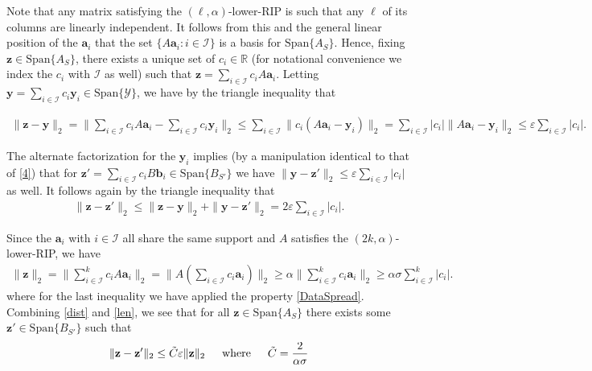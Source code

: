 \documentclass[journal,onecolumn]{IEEEtran}
\begin{document}
Note that any matrix satisfying the $(\ell,\alpha)$-lower-RIP is such that any $\ell$ of its columns are linearly independent. It follows from this and the general linear position of the $\mathbf{a}_i$ that the set $\{A\mathbf{a}_i: i \in \mathcal{I}\}$ is a basis for $\text{Span}\{A_S\}$. Hence, fixing $\mathbf{z} \in \text{Span}\{A_S\}$, there exists a unique set of $c_i \in \mathbb{R}$ (for notational convenience we index the $c_i$ with $\mathcal{I}$ as well) such that $\mathbf{z} = \sum_{i \in \mathcal{I}} c_iA\mathbf{a}_i$. Letting $\mathbf{y} = \sum_{i \in \mathcal{I}} c_i\mathbf{y}_i  \in \text{Span}\{\mathcal{Y}\}$, we have by the triangle inequality that

\begin{align}\label{4}
\|\mathbf{z} - \mathbf{y}\|_2 = \| \sum_{i \in \mathcal{I}} c_i A \mathbf{a}_i -  \sum_{i \in \mathcal{I}} c_i \mathbf{y}_i \|_2 \leq \sum_{i \in \mathcal{I}} \| c_i (A\mathbf{a}_i - \mathbf{y}_i) \|_2 = \sum_{i \in \mathcal{I}} |c_i| \| A\mathbf{a}_i - \mathbf{y}_i \|_2 \leq \varepsilon \sum_{i \in \mathcal{I}} |c_i|.
\end{align}

The alternate factorization for the $\mathbf{y}_i$ implies (by a manipulation identical to that of \eqref{4}) that for $\mathbf{z}' = \sum_{i \in \mathcal{I}} c_i B\mathbf{b}_i \in \text{Span}\{B_{S'}\}$ we have $\|\mathbf{y} - \mathbf{z}'\|_2 \leq \varepsilon \sum_{i \in \mathcal{I}} |c_i|$ as well. It follows again by the triangle inequality that
\begin{align}\label{dist}
\|\mathbf{z} - \mathbf{z}'\|_2 \leq \|\mathbf{z} - \mathbf{y}\|_2 + \|\mathbf{y} - \mathbf{z}'\|_2 = 2 \varepsilon \sum_{i \in \mathcal{I}} |c_i|.
\end{align}

Since the $\mathbf{a}_i$ with $i \in \mathcal{I}$ all share the same support and $A$ satisfies the $(2k,\alpha)$-lower-RIP, we have 
\begin{align}\label{len}
\|\mathbf{z}\|_2 = \|\sum_{i \in \mathcal{I}}^k c_i A \mathbf{a}_i\|_2 
= \|A (\sum_{i \in \mathcal{I}} c_i \mathbf{a}_i) \|_2 
\geq \alpha \|\sum_{i \in \mathcal{I}}^k c_i \mathbf{a}_i\|_2 
\geq \alpha\sigma \sum_{i \in \mathcal{I}}^k |c_i|.
\end{align}
%
where for the last inequality we have applied the property \eqref{DataSpread}. Combining \eqref{dist} and \eqref{len}, we see that for all $\mathbf{z} \in \text{Span}\{A_S\}$ there exists some $\mathbf{z}' \in \text{Span}\{B_{S'}\}$ such that
\begin{align*}
\|\mathbf{z} - \mathbf{z}'\|_2 \leq \tilde C\varepsilon \|\mathbf{z}\|_2 \indent \text{where} \indent \tilde C = \frac{ 2 }{ \alpha \sigma }
\end{align*}
\end{document}
